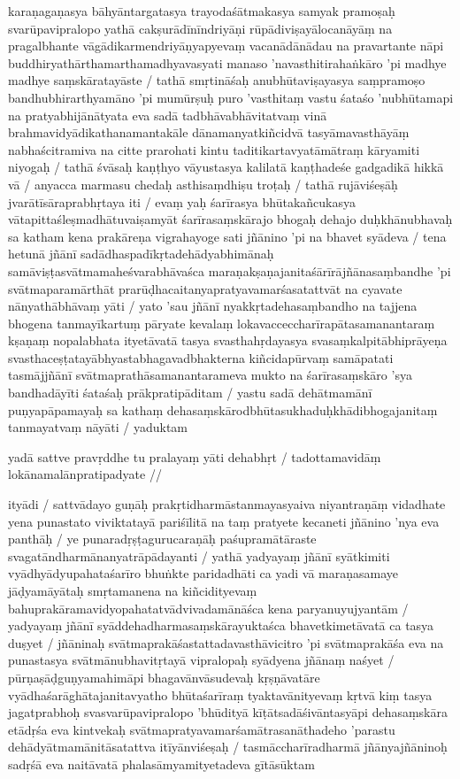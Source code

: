 karaṇagaṇasya bāhyāntargatasya trayodaśātmakasya samyak pramoṣaḥ svarūpavipralopo yathā cakṣurādīnīndriyāṇi rūpādiviṣayālocanāyāṃ na pragalbhante vāgādikarmendriyāṇyapyevaṃ vacanādānādau na pravartante nāpi buddhiryathārthamarthamadhyavasyati manaso 'navasthitirahaṅkāro 'pi madhye madhye saṃskāratayāste  / tathā smṛtināśaḥ anubhūtaviṣayasya saṃpramoṣo bandhubhirarthyamāno 'pi mumūrṣuḥ puro 'vasthitaṃ vastu śataśo 'nubhūtamapi na pratyabhijānātyata eva sadā tadbhāvabhāvitatvaṃ vinā brahmavidyādikathanamantakāle dānamanyatkiñcidvā tasyāmavasthāyāṃ nabhaścitramiva na citte prarohati kintu taditikartavyatāmātraṃ kāryamiti niyogaḥ  / tathā śvāsaḥ kaṇṭhyo vāyustasya kalilatā kaṇṭhadeśe gadgadikā hikkā vā  / anyacca marmasu chedaḥ asthisaṃdhiṣu troṭaḥ  / tathā rujāviśeṣāḥ jvarātīsāraprabhṛtaya iti  / evaṃ yaḥ śarīrasya bhūtakañcukasya vātapittaśleṣmadhātuvaiṣamyāt śarīrasaṃskārajo bhogaḥ dehajo duḥkhānubhavaḥ sa katham kena prakāreṇa vigrahayoge sati jñānino 'pi na bhavet syādeva  / tena hetunā jñānī sadādhaspadīkṛtadehādyabhimānaḥ samāviṣṭasvātmamaheśvarabhāvaśca maraṇakṣaṇajanitaśārīrājñānasaṃbandhe 'pi svātmaparamārthāt prarūḍhacaitanyapratyavamarśasatattvāt na cyavate nānyathābhāvaṃ yāti  / yato 'sau jñānī nyakkṛtadehasaṃbandho na tajjena bhogena tanmayīkartuṃ pāryate kevalaṃ lokavacceccharīrapātasamanantaraṃ kṣaṇaṃ nopalabhata ityetāvatā tasya svasthahṛdayasya svasaṃkalpitābhiprāyeṇa svasthaceṣṭatayābhyastabhagavadbhakterna kiñcidapūrvaṃ samāpatati tasmājjñānī svātmaprathāsamanantarameva mukto na śarīrasaṃskāro 'sya bandhadāyīti śataśaḥ prākpratipāditam  / yastu sadā dehātmamānī puṇyapāpamayaḥ sa kathaṃ dehasaṃskārodbhūtasukhaduḥkhādibhogajanitaṃ tanmayatvaṃ nāyāti  / yaduktam

yadā sattve pravṛddhe tu pralayaṃ yāti dehabhṛt  /
tadottamavidāṃ lokānamalānpratipadyate  //

ityādi  / sattvādayo guṇāḥ prakṛtidharmāstanmayasyaiva niyantraṇāṃ vidadhate yena punastato viviktatayā pariśīlitā na taṃ pratyete kecaneti jñānino 'nya eva panthāḥ  / ye punaradṛṣṭagurucaraṇāḥ paśupramātāraste svagatāndharmānanyatrāpādayanti  / yathā yadyayaṃ jñānī syātkimiti vyādhyādyupahataśarīro bhuṅkte paridadhāti ca yadi vā maraṇasamaye jāḍyamāyātaḥ smṛtamanena na kiñcidityevaṃ bahuprakāramavidyopahatatvādvivadamānāśca kena paryanuyujyantām  / yadyayaṃ jñānī syāddehadharmasaṃskārayuktaśca bhavetkimetāvatā ca tasya duṣyet  / jñāninaḥ svātmaprakāśastattadavasthāvicitro 'pi svātmaprakāśa eva na punastasya svātmānubhavitṛtayā vipralopaḥ syādyena jñānaṃ naśyet  / pūrṇaṣāḍguṇyamahimāpi bhagavānvāsudevaḥ kṛṣṇāvatāre vyādhaśarāghātajanitavyatho bhūtaśarīraṃ tyaktavānityevaṃ kṛtvā kiṃ tasya jagatprabhoḥ svasvarūpavipralopo 'bhūdityā kīṭātsadāśivāntasyāpi dehasaṃskāra etādṛśa eva kintvekaḥ svātmapratyavamarśamātrasanāthadeho 'parastu dehādyātmamānitāsatattva itīyānviśeṣaḥ  / tasmāccharīradharmā jñānyajñāninoḥ sadṛśā eva naitāvatā phalasāmyamityetadeva gītāsūktam

